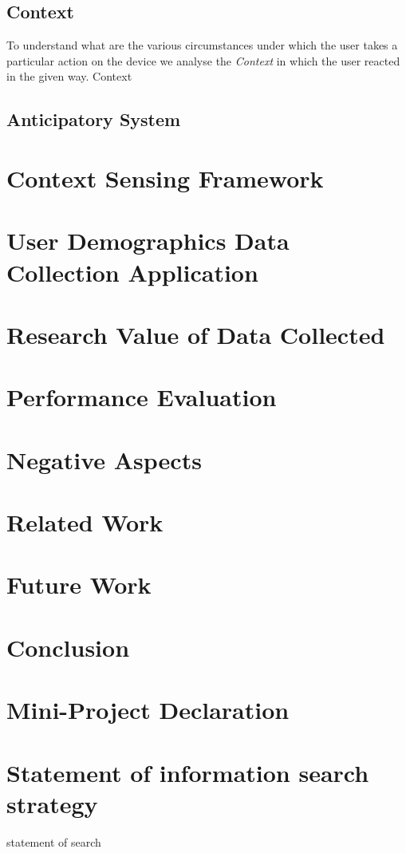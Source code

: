 \documentclass[12pt]{report}
\begin{document}
\section{Context}
To understand what are the various circumstances under which the user takes a particular action on the device we analyse the \textit{Context} in which the user reacted in the given way. Context
\section{Anticipatory System}
\chapter{Context Sensing Framework}
\chapter{User Demographics Data Collection Application}
\chapter{Research Value of Data Collected}
\chapter{Performance Evaluation}
\chapter{Negative Aspects}    
\chapter{Related Work}
\chapter{Future Work}
\chapter{Conclusion}




\appendix
\chapter{Mini-Project Declaration}


\chapter{Statement of information search strategy}

statement of search
\end{document}
